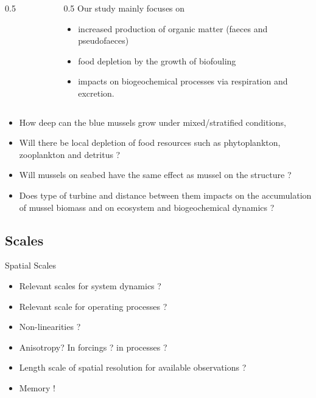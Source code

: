 \documentclass[final,xcolor=dvipsnames]{beamer}
\begin{document}
\begin{frame}
\begin{exampleblock}{}
\begin{columns}
\begin{column}{0.5\framewidth}
\begin{figure}
    \label{fig:my_label}
\end{figure}
\end{column}
\begin{column}{0.5\framewidth}
Our study mainly focuses on 
\begin{itemize}
    \item increased production of organic matter (faeces and pseudofaeces)
    \item food depletion by the growth of biofouling %
    \item impacts on biogeochemical processes via respiration and excretion. 
\end{itemize}
\end{column}
\end{columns}
\end{exampleblock}
\end{frame}

\begin{frame}
\begin{exampleblock}{}
\begin{itemize}
    \item How deep can the blue mussels grow under mixed/stratified conditions,
    \item Will there be local depletion of food resources such as phytoplankton, zooplankton and detritus ?
    \item Will mussels on seabed have the same effect as mussel on the structure ? 
    \item Does type of turbine and distance between them impacts on the accumulation of mussel biomass and on ecosystem and biogeochemical dynamics ?
\end{itemize}
\end{exampleblock}
\end{frame}

\subsection{Scales}
\begin{frame}
\begin{block}{Spatial Scales}
\begin{itemize}[<+->]
    \item Relevant scales for system dynamics ?
    \item Relevant scale for operating processes ?
    \item Non-linearities ?
    \item Anisotropy? In forcings ? in processes ?
    \item Length scale of spatial resolution for available observations ?
    \item Memory ! 
\end{itemize}
\end{block}
\end{frame}
\end{document}
